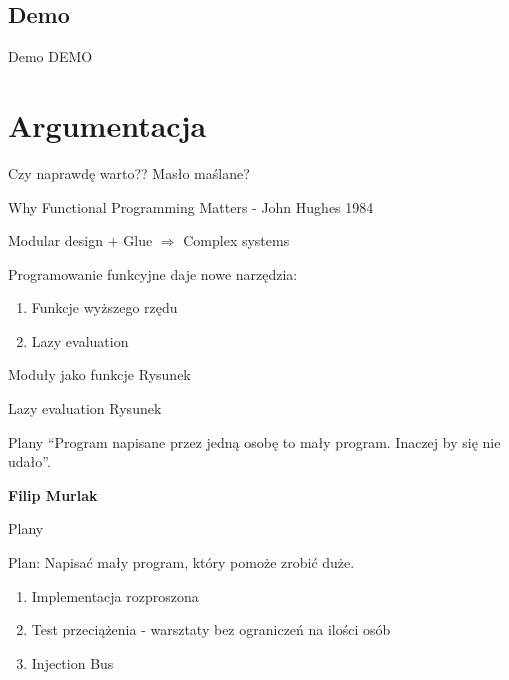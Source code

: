 \documentclass[smaller]{beamer}
\begin{document}
\subsection{Demo}
\begin{frame}{Demo}
 DEMO
\end{frame}

\section{Argumentacja}

\begin{frame}{Czy naprawdę warto??}
 Masło maślane?

\hfill

\pause

Why Functional Programming Matters - John Hughes 1984

\hfill

Modular design $+$ Glue $\Rightarrow$ Complex systems

\pause

\hfill

Programowanie funkcyjne daje nowe narzędzia:
\begin{enumerate}
 \item Funkcje wyższego rzędu 
 \item Lazy evaluation
\end{enumerate}

\end{frame}

\begin{frame}{Moduły jako funkcje}
 Rysunek
\end{frame}

\begin{frame}{Lazy evaluation}
 Rysunek
\end{frame}


\begin{frame}{Plany}
``Program napisane przez jedną osobę to mały program. Inaczej by się nie udało''.

\textbf{Filip Murlak}
\end{frame}

\begin{frame}{Plany}

Plan: Napisać mały program, który pomoże zrobić duże.

 \begin{enumerate}
  \item<2-> Implementacja rozproszona
  \item<3-> Test przeciążenia - warsztaty bez ograniczeń na ilości osób
  \item<4-> Injection Bus
 \end{enumerate}
\end{frame}
\end{document}
